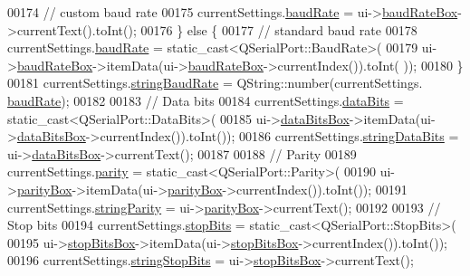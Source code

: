 \begin{DoxyCode}
{{{{{00174         \textcolor{comment}{// custom baud rate}
00175         currentSettings.\hyperlink{a00075_ac19cc9431552857a75c657a464ba0700}{baudRate} = ui->\hyperlink{a00082_a766a61db4a8c72219543f7c096ae5601}{baudRateBox}->currentText().toInt();
00176     \} \textcolor{keywordflow}{else} \{
00177         \textcolor{comment}{// standard baud rate}
00178         currentSettings.\hyperlink{a00075_ac19cc9431552857a75c657a464ba0700}{baudRate} = \textcolor{keyword}{static\_cast<}QSerialPort::BaudRate\textcolor{keyword}{>}(
00179                     ui->\hyperlink{a00082_a766a61db4a8c72219543f7c096ae5601}{baudRateBox}->itemData(ui->\hyperlink{a00082_a766a61db4a8c72219543f7c096ae5601}{baudRateBox}->currentIndex()).toInt(
      ));
00180     \}
00181     currentSettings.\hyperlink{a00075_a54e9d461f783386f314bc24b96665e53}{stringBaudRate} = QString::number(currentSettings.
      \hyperlink{a00075_ac19cc9431552857a75c657a464ba0700}{baudRate});
00182 
00183     \textcolor{comment}{// Data bits}
00184     currentSettings.\hyperlink{a00075_a7dcd85d028a09508cb4567cf631b40e9}{dataBits} = \textcolor{keyword}{static\_cast<}QSerialPort::DataBits\textcolor{keyword}{>}(
00185                 ui->\hyperlink{a00082_ab6082bb196e22af4ca04a04db3402166}{dataBitsBox}->itemData(ui->\hyperlink{a00082_ab6082bb196e22af4ca04a04db3402166}{dataBitsBox}->currentIndex()).toInt());
00186     currentSettings.\hyperlink{a00075_ab589b733b78af17744ab75067bfce051}{stringDataBits} = ui->\hyperlink{a00082_ab6082bb196e22af4ca04a04db3402166}{dataBitsBox}->currentText();
00187 
00188     \textcolor{comment}{// Parity}
00189     currentSettings.\hyperlink{a00075_ae08a00aa2e45218dade9046e3624cce7}{parity} = \textcolor{keyword}{static\_cast<}QSerialPort::Parity\textcolor{keyword}{>}(
00190                 ui->\hyperlink{a00082_a88c0b5d1f96a308ab115937b090f7bba}{parityBox}->itemData(ui->\hyperlink{a00082_a88c0b5d1f96a308ab115937b090f7bba}{parityBox}->currentIndex()).toInt());
00191     currentSettings.\hyperlink{a00075_aa2c662b2fb315f038e827d63d83b059b}{stringParity} = ui->\hyperlink{a00082_a88c0b5d1f96a308ab115937b090f7bba}{parityBox}->currentText();
00192 
00193     \textcolor{comment}{// Stop bits}
00194     currentSettings.\hyperlink{a00075_ab88ff384f7c1127bcbe2dd97b49696a4}{stopBits} = \textcolor{keyword}{static\_cast<}QSerialPort::StopBits\textcolor{keyword}{>}(
00195                 ui->\hyperlink{a00082_ad61890c5fd0acc9e72385efd02df90c0}{stopBitsBox}->itemData(ui->\hyperlink{a00082_ad61890c5fd0acc9e72385efd02df90c0}{stopBitsBox}->currentIndex()).toInt());
00196     currentSettings.\hyperlink{a00075_abde3c8410f779688ce6c2fcbbbb84f10}{stringStopBits} = ui->\hyperlink{a00082_ad61890c5fd0acc9e72385efd02df90c0}{stopBitsBox}->currentText();
}}}}}
\end{DoxyCode}
